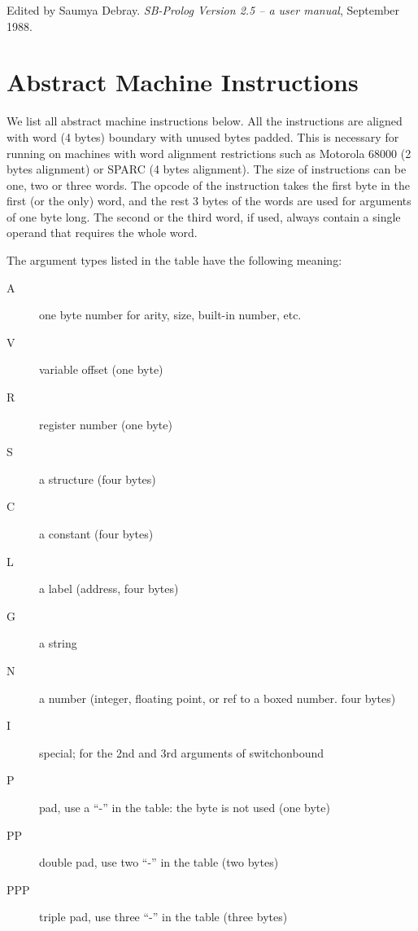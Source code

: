 \documentclass[11pt]{article}
\begin{document}
\begin{thebibliography}{[8]}
	Edited by Saumya Debray. {\it SB-Prolog Version 2.5 -- a user manual},
	September 1988.
\end{thebibliography}

\newpage

\appendix

\section		{Abstract Machine Instructions}

We list all abstract machine instructions below. All the instructions
are aligned with word (4 bytes) boundary with unused bytes padded.
This is necessary for running on machines with word alignment
restrictions such as Motorola 68000 (2 bytes alignment) or SPARC (4
bytes alignment). The size of instructions can be one, two or three
words. The opcode of the instruction takes the first byte in the first
(or the only) word, and the rest 3 bytes of the words are used for
arguments of one byte long. The second or the third word, if used,
always contain a single operand that requires the whole word.  

The
argument types listed in the table have the following meaning:

\begin{description}
  \item[A] one byte number for arity, size, built-in number, etc.
  \item[V] variable offset (one byte)
  \item[R] register number (one byte)
  \item[S] a structure (four bytes)
  \item[C] a constant (four bytes)
  \item[L] a label (address, four bytes)
  \item[G] a string
  \item[N] a number (integer, floating point, or ref to a boxed number. four bytes)
  \item[I] special; for the 2nd and 3rd arguments of switchonbound
  \item[P] pad, use a ``-'' in the table: the byte is not used (one byte)
  \item[PP] double pad, use two ``-'' in the table (two bytes)
  \item[PPP] triple pad, use three ``-'' in the table (three bytes)
\end{description}
\end{document}
